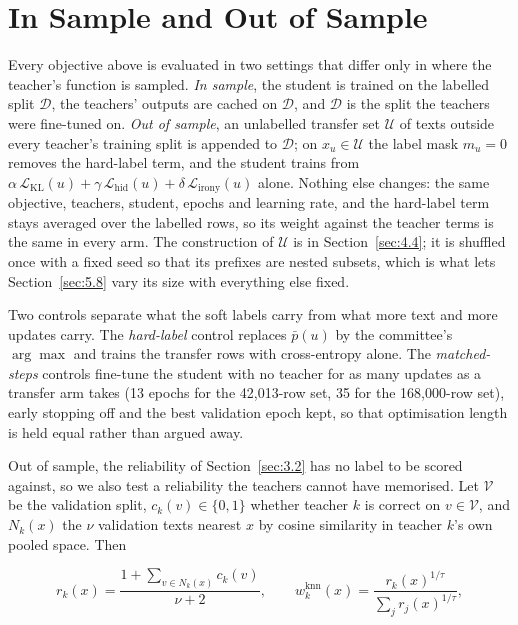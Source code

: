 \section{In Sample and Out of Sample}
\label{sec:3.5}
Every objective above is evaluated in two settings that differ only in where the teacher's function
is sampled. \emph{In sample}, the student is trained on the labelled split $\mathcal{D}$, the
teachers' outputs are cached on $\mathcal{D}$, and $\mathcal{D}$ is the split the teachers were
fine-tuned on. \emph{Out of sample}, an unlabelled transfer set $\mathcal{U}$ of texts outside every
teacher's training split is appended to $\mathcal{D}$; on $x_u \in \mathcal{U}$ the label mask $m_u
= 0$ removes the hard-label term, and the student trains from $\alpha\, \mathcal{L}_{\mathrm{KL}}(u)
+ \gamma\, \mathcal{L}_{\mathrm{hid}}(u) + \delta\, \mathcal{L}_{\mathrm{irony}}(u)$ alone. Nothing
else changes: the same objective, teachers, student, epochs and learning rate, and the hard-label
term stays averaged over the labelled rows, so its weight against the teacher terms is the same in
every arm. The construction of $\mathcal{U}$ is in Section~\ref{sec:4.4}; it is shuffled once with a
fixed seed so that its prefixes are nested subsets, which is what lets Section~\ref{sec:5.8} vary
its size with everything else fixed.

Two controls separate what the soft labels carry from what more text and more updates carry. The
\emph{hard-label} control replaces $\bar p(u)$ by the committee's $\arg\max$ and trains the transfer
rows with cross-entropy alone. The \emph{matched-steps} controls fine-tune the student with no
teacher for as many updates as a transfer arm takes (13 epochs for the 42,013-row set, 35 for the
168,000-row set), early stopping off and the best validation epoch kept, so that optimisation length
is held equal rather than argued away.

Out of sample, the reliability of Section~\ref{sec:3.2} has no label to be scored against, so we
also test a reliability the teachers cannot have memorised. Let $\mathcal{V}$ be the validation
split, $c_k(v) \in \{0, 1\}$ whether teacher $k$ is correct on $v \in \mathcal{V}$, and $N_k(x)$ the
$\nu$ validation texts nearest $x$ by cosine similarity in teacher $k$'s own pooled space. Then

\begin{equation}
r_k(x) = \frac{1 + \sum_{v \in N_k(x)} c_k(v)}{\nu + 2}, \qquad
w_k^{\mathrm{knn}}(x) = \frac{r_k(x)^{1/\tau}}{\sum_j r_j(x)^{1/\tau}},
\end{equation}

